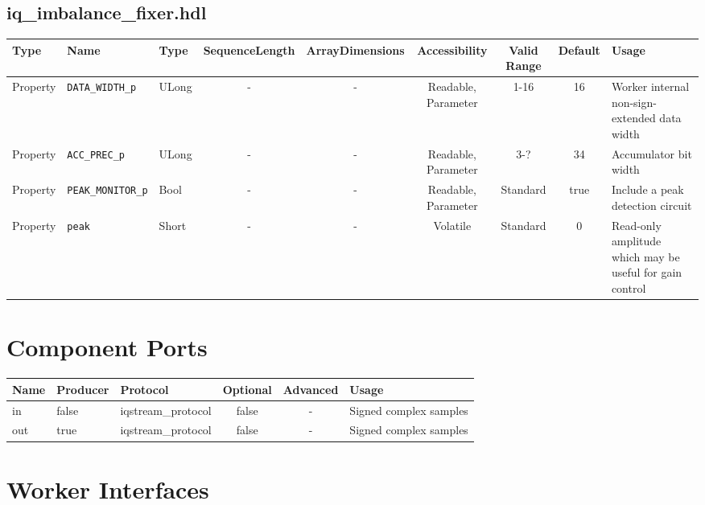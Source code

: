 \documentclass{article}
\def\comp{iq\_imbalance\_fixer}
\begin{document}
\begin{landscape}
		\subsection*{\comp.hdl}
		\begin{scriptsize}
			\begin{tabular}{|p{3cm}|p{2cm}|p{1cm}|c|c|c|c|c|p{5cm}|}
				\hline
				\rowcolor{blue}
				Type     & Name                  & Type  & SequenceLength & ArrayDimensions & Accessibility       & Valid Range & Default & Usage                                        \\
				\hline
				Property & \verb+DATA_WIDTH_p+   & ULong & -              & -               & Readable, Parameter & 1-16        & 16      & Worker internal non-sign-extended data width \\
				\hline
				Property & \verb+ACC_PREC_p+     & ULong & -              & -               & Readable, Parameter & 3-?         & 34      & Accumulator bit width                        \\
				\hline
				Property & \verb+PEAK_MONITOR_p+ & Bool  & -              & -               & Readable, Parameter & Standard    & true    &
				Include a peak detection circuit\\
				\hline
				Property & \verb+peak+           & Short & -              & -               & Volatile            & Standard    & 0       &
				Read-only amplitude which may be useful for gain control\\
				\hline
			\end{tabular}
		\end{scriptsize}

		\section*{Component Ports}
		\begin{scriptsize}
			\begin{tabular}{|M{2cm}|M{1.5cm}|M{4cm}|c|c|M{9cm}|}
				\hline
				\rowcolor{blue}
				Name & Producer & Protocol           & Optional & Advanced & Usage                  \\
				\hline
				in   & false    & iqstream\_protocol & false    & -        & Signed complex samples \\
				\hline
				out  & true     & iqstream\_protocol & false    & -        & Signed complex samples \\
				\hline
			\end{tabular}
		\end{scriptsize}
		\section*{Worker Interfaces}

\end{landscape}
\end{document}
